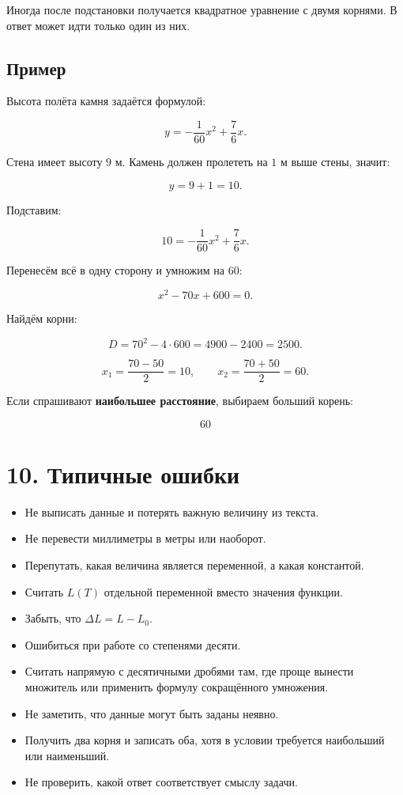 \documentclass[a4paper,12pt]{article}
\begin{document}
Иногда после подстановки получается квадратное уравнение с двумя корнями. В ответ может идти только один из них.

\subsection*{Пример}

Высота полёта камня задаётся формулой:

\[
y=-\frac{1}{60}x^2+\frac76x.
\]

Стена имеет высоту \(9\) м. Камень должен пролететь на \(1\) м выше стены, значит:

\[
y=9+1=10.
\]

Подставим:

\[
10=-\frac{1}{60}x^2+\frac76x.
\]

Перенесём всё в одну сторону и умножим на \(60\):

\[
x^2-70x+600=0.
\]

Найдём корни:

\[
D=70^2-4\cdot600=4900-2400=2500.
\]

\[
x_1=\frac{70-50}{2}=10,
\qquad
x_2=\frac{70+50}{2}=60.
\]

Если спрашивают \textbf{наибольшее расстояние}, выбираем больший корень:

\[
\boxed{60}
\]

\section*{10. Типичные ошибки}

\begin{itemize}
  \item Не выписать данные и потерять важную величину из текста.
  \item Не перевести миллиметры в метры или наоборот.
  \item Перепутать, какая величина является переменной, а какая константой.
  \item Считать \(L(T)\) отдельной переменной вместо значения функции.
  \item Забыть, что \(\Delta L=L-L_0\).
  \item Ошибиться при работе со степенями десяти.
  \item Считать напрямую с десятичными дробями там, где проще вынести множитель или применить формулу сокращённого умножения.
  \item Не заметить, что данные могут быть заданы неявно.
  \item Получить два корня и записать оба, хотя в условии требуется наибольший или наименьший.
  \item Не проверить, какой ответ соответствует смыслу задачи.
\end{itemize}
\end{document}
